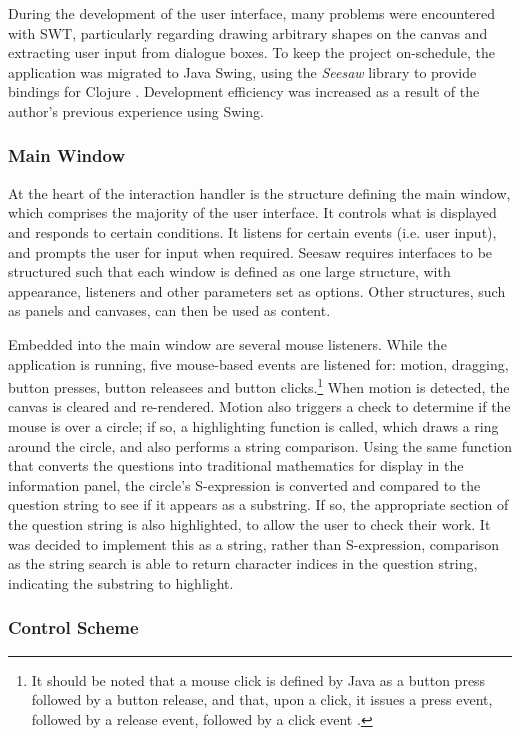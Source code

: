 \documentclass[12pt,twoside,notitlepage,xetex]{report}
\begin{document}
During the development of the user interface, many problems were encountered with SWT, particularly regarding drawing arbitrary shapes on the canvas and extracting user input from dialogue boxes.  To keep the project on-schedule, the application was migrated to Java Swing, using the \emph{Seesaw} library to provide bindings for Clojure \cite{Seesaw}.  Development efficiency was increased as a result of the author's previous experience using Swing.

\subsubsection{Main Window}

At the heart of the interaction handler is the structure defining the main window, which comprises the majority of the user interface.  It controls what is displayed and responds to certain conditions.  It listens for certain events (i.e. user input), and prompts the user for input when required.  Seesaw requires interfaces to be structured such that each window is defined as one large structure, with appearance, listeners and other parameters set as options.  Other structures, such as panels and canvases, can then be used as content.

Embedded into the main window are several mouse listeners.  While the application is running, five mouse-based events are listened for: motion, dragging, button presses, button releasees and button clicks.\footnote{It should be noted that a mouse click is defined by Java as a button press followed by a button release, and that, upon a click, it issues a press event, followed by a release event, followed by a click event \cite{JavaApi}.}  When motion is detected, the canvas is cleared and re-rendered.  Motion also triggers a check to determine if the mouse is over a circle; if so, a highlighting function is called, which draws a ring around the circle, and also performs a string comparison.  Using the same function that converts the questions into traditional mathematics for display in the information panel, the circle's S-expression is converted and compared to the question string to see if it appears as a substring.  If so, the appropriate section of the question string is also highlighted, to allow the user to check their work.  It was decided to implement this as a string, rather than S-expression, comparison as the string search is able to return character indices in the question string, indicating the substring to highlight.

\subsubsection{Control Scheme}
\end{document}
